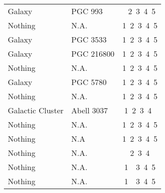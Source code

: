 \begin{table}[H]
\begin{tabular}{l L{4.3cm}@{\hspace{0.25\tabcolsep}} c}
        Galaxy           & PGC 993                                          & \phantom{1}~2~3~4~5                               \\ %
        Nothing          & N.A.                                             & 1~2~3~4~5                                         \\ %
        Galaxy           & PGC 3533                                         & 1~2~3~4~5                                         \\ %
        Galaxy           & PGC 216800                                       & 1~2~3~4~5                                         \\ %
        Nothing          & N.A.                                             & 1~2~3~4~5                                         \\ %
        Galaxy           & PGC 5780                                         & 1~2~3~4~5                                         \\ %
        Nothing          & N.A.                                             & 1~2~3~4~5                                         \\ %
        Galactic Cluster & Abell 3037                                       & 1~2~3~4~\phantom{5}                               \\ %
        Nothing          & N.A.                                             & 1~2~3~4~5                                         \\ %
        Nothing          & N.A                                              & 1~2~3~4~5                                         \\ %
        Nothing          & N.A.                                             & \phantom{1}~2~3~4~\phantom{5}                     \\ %
        Nothing          & N.A.                                             & 1~\phantom{2}~3~4~5                               \\ %
        Nothing          & N.A.                                             & 1~\phantom{2}~3~4~5                               \\ %

\end{tabular}
\end{table}
